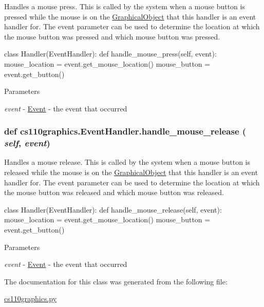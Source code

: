 Handles a mouse press. This is called by the system when a mouse button is pressed while the mouse is on the \hyperlink{classcs110graphics_1_1GraphicalObject}{GraphicalObject} that this handler is an event handler for. The event parameter can be used to determine the location at which the mouse button was pressed and which mouse button was pressed. 
\begin{DoxyCode}
 class Handler(EventHandler):
     def handle_mouse_press(self, event):
         mouse_location = event.get_mouse_location()
         mouse_button = event.get_button()
\end{DoxyCode}
 
\begin{DoxyParams}{Parameters}
\item[{\em event}]-\/ \hyperlink{classcs110graphics_1_1Event}{Event} -\/ the event that occurred \end{DoxyParams}
\hypertarget{classcs110graphics_1_1EventHandler_a320a7dbf68d37e0101b237bff1713088}{
\subsubsection[{handle\_\-mouse\_\-release}]{\setlength{\rightskip}{0pt plus 5cm}def cs110graphics.EventHandler.handle\_\-mouse\_\-release ( {\em self}, \/   {\em event})}}
\label{classcs110graphics_1_1EventHandler_a320a7dbf68d37e0101b237bff1713088}


Handles a mouse release. This is called by the system when a mouse button is released while the mouse is on the \hyperlink{classcs110graphics_1_1GraphicalObject}{GraphicalObject} that this handler is an event handler for. The event parameter can be used to determine the location at which the mouse button was released and which mouse button was released. 
\begin{DoxyCode}
 class Handler(EventHandler):
     def handle_mouse_release(self, event):
         mouse_location = event.get_mouse_location()
         mouse_button = event.get_button()
\end{DoxyCode}
 
\begin{DoxyParams}{Parameters}
\item[{\em event}]-\/ \hyperlink{classcs110graphics_1_1Event}{Event} -\/ the event that occurred \end{DoxyParams}


The documentation for this class was generated from the following file:\begin{DoxyCompactItemize}
\item 
\hyperlink{cs110graphics_8py}{cs110graphics.py}\end{DoxyCompactItemize}
